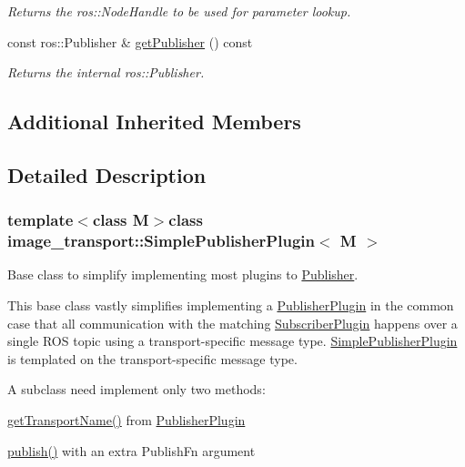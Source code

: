 \begin{DoxyCompactItemize}
\begin{DoxyCompactList}\small\item\em Returns the ros\-::\-Node\-Handle to be used for parameter lookup. \end{DoxyCompactList}\item 
const ros\-::\-Publisher \& \hyperlink{classimage__transport_1_1_simple_publisher_plugin_a11ad943c96711dc4a797a2b577ae9ea3}{get\-Publisher} () const 
\begin{DoxyCompactList}\small\item\em Returns the internal ros\-::\-Publisher. \end{DoxyCompactList}\end{DoxyCompactItemize}
\subsection*{Additional Inherited Members}


\subsection{Detailed Description}
\subsubsection*{template$<$class M$>$class image\-\_\-transport\-::\-Simple\-Publisher\-Plugin$<$ M $>$}

Base class to simplify implementing most plugins to \hyperlink{classimage__transport_1_1_publisher}{Publisher}. 

This base class vastly simplifies implementing a \hyperlink{classimage__transport_1_1_publisher_plugin}{Publisher\-Plugin} in the common case that all communication with the matching \hyperlink{classimage__transport_1_1_subscriber_plugin}{Subscriber\-Plugin} happens over a single R\-O\-S topic using a transport-\/specific message type. \hyperlink{classimage__transport_1_1_simple_publisher_plugin}{Simple\-Publisher\-Plugin} is templated on the transport-\/specific message type.

A subclass need implement only two methods\-:
\begin{DoxyItemize}
\item \hyperlink{classimage__transport_1_1_publisher_plugin_abe0cd36dc3c170adb6aec8bc6d81d52e}{get\-Transport\-Name()} from \hyperlink{classimage__transport_1_1_publisher_plugin}{Publisher\-Plugin}
\item \hyperlink{classimage__transport_1_1_simple_publisher_plugin_a409f2078d4aa3466e843404b88cfe101}{publish()} with an extra Publish\-Fn argument
\end{DoxyItemize}

